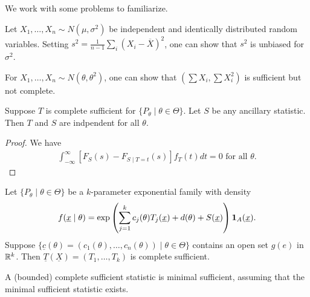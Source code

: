 We work with some problems to familiarize.

\begin{example}
    Let $X_{1},\ldots,X_{n} \sim N(\mu,\sigma^{2})$ be independent and identically distributed random variables. Setting $s^{2} = \frac{1}{n-1} \sum_{i} (X_{i}-\overline{X})^{2}$, one can show that $s^{2}$ is unbiased for $\sigma^{2}$.
\end{example}

\begin{example}
    For $X_{1},\ldots,X_{n} \sim N(\theta,\theta^{2})$, one can show that $(\sum X_{i}, \sum X_{i}^{2})$ is sufficient but not complete.
\end{example}

\begin{theorem}
    Suppose $T$ is complete sufficient for $\{P_{\theta} \mid \theta \in \Theta\}$. Let $S$ be any ancillary statistic. Then $T$ and $S$ are indpendent for all $\theta$.
\end{theorem}

\begin{proof}
    We have
    \begin{align}
        \int_{-\infty}^{\infty} [F_{S}(s) - F_{S \mid T = t}(s)]f_{T}(t) dt = 0 \text{ for all } \theta.
    \end{align}
\end{proof}

\begin{theorem}
    Let $\{P_{\theta} \mid \theta \in \Theta\}$ be a $k$-parameter exponential family with density
    \begin{align}
        f(\underline{x} \mid \theta) = \exp \left( \sum_{j=1}^{k} c_{j}(\theta) T_{j}(\underline{x}) + d(\theta) + S(\underline{x}) \right)\textbf{1}_{A}(\underline{x}).
    \end{align}
    Suppose $\{\underline{c}(\theta) = (c_{1}(\theta),\ldots,c_{n}(\theta)) \mid \theta \in \Theta\}$ contains an open set $g(e)$ in $\mathbb{R}^{k}$. Then $\underline{T}(\underline{X}) = (T_{1},\ldots,T_{k})$ is complete sufficient.
\end{theorem}


\begin{theorem}
    A (bounded) complete sufficient statistic is minimal sufficient, assuming that the minimal sufficient statistic exists.
\end{theorem}

